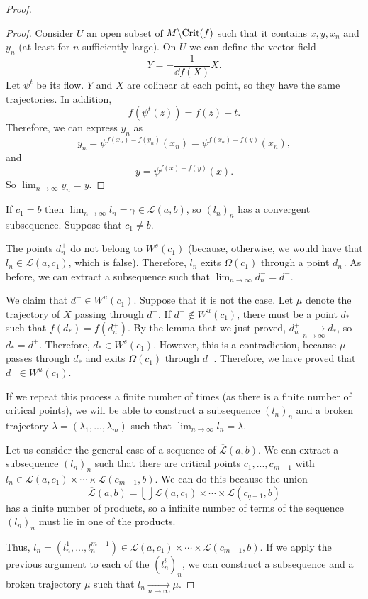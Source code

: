 \begin{proof}
\begin{proof}
Consider $U$ an open subset of $M \backslash \text{Crit}(f)$ such that it contains $x,y, x_n$ and $y_n$ (at least for $n$ sufficiently large). On $U$ we can define the vector field
$$Y = - \frac1{\dd f(X)} X .$$
Let $\psi^t$ be its flow. $Y$ and $X$ are colinear at each point, so they have the same trajectories. In addition,
$$f(\psi^t(z)) = f(z) - t .$$
Therefore, we can express $y_n$ as
$$y_n = \psi^{f(x_n)-f(y_n)}(x_n) = \psi^{f(x_n)-f(y)}(x_n) ,$$
and
$$y = \psi^{f(x)-f(y)}(x) .$$
So $\displaystyle\lim_{n \rightarrow \infty} y_n = y$.
\end{proof}

If $c_1 = b$ then $\displaystyle\lim_{n \rightarrow \infty} l_n = \gamma \in \mathcal{L}(a,b)$, so $(l_n)_n$ has a convergent subsequence. Suppose that $c_1 \neq b$.

The points $d_n^+$ do not belong to $W^s(c_1)$ (because, otherwise, we would have that $l_n \in \mathcal{L}(a,c_1)$, which is false). Therefore, $l_n$ exits $\Omega(c_1)$ through a point $d_n^-$. As before, we can extract a subsequence such that $\displaystyle\lim_{n \rightarrow \infty} d_n^- = d^-$.

We claim that $d^- \in W^u(c_1)$. Suppose that it is not the case. Let $\mu$ denote the trajectory of $X$ passing through $d^-$. If $d^- \notin W^u(c_1)$, there must be a point $d_{\ast}$ such that $f(d_{\ast}) = f(d_n^+)$. By the lemma that we just proved, $d_n^+ \xrightarrow[n \rightarrow \infty]{} d_{\ast}$, so $d_{\ast} = d^+$. Therefore, $d_{\ast} \in W^s(c_1)$. However, this is a contradiction, because $\mu$ passes through $d_{\ast}$ and exits $\Omega(c_1)$ through $d^-$. Therefore, we have proved that $d^- \in W^u(c_1)$.

If we repeat this process a finite number of times (as there is a finite number of critical points), we will be able to construct a subsequence $(l_n)_n$ and a broken trajectory $\lambda = (\lambda_1,...,\lambda_m)$ such that $\displaystyle\lim_{n \rightarrow \infty} l_n = \lambda$.

Let us consider the general case of a sequence of $\overline{\mathcal{L}}(a,b)$. We can extract a subsequence $(l_n)_n$ such that there are critical points $c_1,...,c_{m-1}$ with $l_n \in \mathcal{L}(a,c_1) \times \cdots \times \mathcal{L}(c_{m-1},b)$. We can do this because the union
$$\overline{\mathcal{L}}(a,b) = \bigcup \mathcal{L}(a,c_1) \times \cdots \times \mathcal{L}(c_{q-1},b)$$
has a finite number of products, so a infinite number of terms of the sequence $(l_n)_n$ must lie in one of the products.

Thus, $l_n = (l_n^1,...,l_n^{m-1}) \in \mathcal{L}(a,c_1) \times \cdots \times \mathcal{L}(c_{m-1},b)$. If we apply the previous argument to each of the $(l_n^i)_n$, we can construct a subsequence and a broken trajectory $\mu$ such that $l_n \xrightarrow[n \rightarrow \infty]{} \mu$.
\end{proof}

